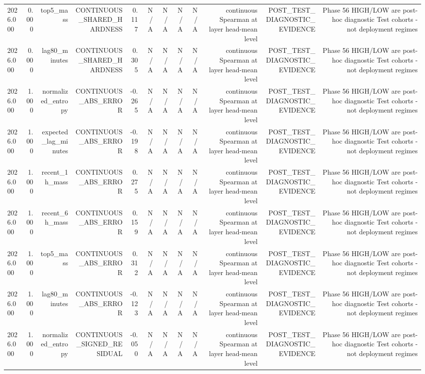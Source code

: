 \begin{table}[h!]
\begin{tabular}{lrrrrrrrrrrr}
2026.000 & 0.000 & top5\_mass & CONTINUOUS\_SHARED\_HARDNESS & 0.117 & N/A & N/A & N/A & N/A & continuous Spearman at layer head-mean level & POST\_TEST\_DIAGNOSTIC\_EVIDENCE & Phase 56 HIGH/LOW are post-hoc diagnostic Test cohorts - not deployment regimes \\
2026.000 & 0.000 & lag80\_minutes & CONTINUOUS\_SHARED\_HARDNESS & 0.305 & N/A & N/A & N/A & N/A & continuous Spearman at layer head-mean level & POST\_TEST\_DIAGNOSTIC\_EVIDENCE & Phase 56 HIGH/LOW are post-hoc diagnostic Test cohorts - not deployment regimes \\
2026.000 & 1.000 & normalized\_entropy & CONTINUOUS\_ABS\_ERROR & -0.265 & N/A & N/A & N/A & N/A & continuous Spearman at layer head-mean level & POST\_TEST\_DIAGNOSTIC\_EVIDENCE & Phase 56 HIGH/LOW are post-hoc diagnostic Test cohorts - not deployment regimes \\
2026.000 & 1.000 & expected\_lag\_minutes & CONTINUOUS\_ABS\_ERROR & -0.198 & N/A & N/A & N/A & N/A & continuous Spearman at layer head-mean level & POST\_TEST\_DIAGNOSTIC\_EVIDENCE & Phase 56 HIGH/LOW are post-hoc diagnostic Test cohorts - not deployment regimes \\
2026.000 & 1.000 & recent\_1h\_mass & CONTINUOUS\_ABS\_ERROR & 0.275 & N/A & N/A & N/A & N/A & continuous Spearman at layer head-mean level & POST\_TEST\_DIAGNOSTIC\_EVIDENCE & Phase 56 HIGH/LOW are post-hoc diagnostic Test cohorts - not deployment regimes \\
2026.000 & 1.000 & recent\_6h\_mass & CONTINUOUS\_ABS\_ERROR & 0.159 & N/A & N/A & N/A & N/A & continuous Spearman at layer head-mean level & POST\_TEST\_DIAGNOSTIC\_EVIDENCE & Phase 56 HIGH/LOW are post-hoc diagnostic Test cohorts - not deployment regimes \\
2026.000 & 1.000 & top5\_mass & CONTINUOUS\_ABS\_ERROR & 0.312 & N/A & N/A & N/A & N/A & continuous Spearman at layer head-mean level & POST\_TEST\_DIAGNOSTIC\_EVIDENCE & Phase 56 HIGH/LOW are post-hoc diagnostic Test cohorts - not deployment regimes \\
2026.000 & 1.000 & lag80\_minutes & CONTINUOUS\_ABS\_ERROR & -0.123 & N/A & N/A & N/A & N/A & continuous Spearman at layer head-mean level & POST\_TEST\_DIAGNOSTIC\_EVIDENCE & Phase 56 HIGH/LOW are post-hoc diagnostic Test cohorts - not deployment regimes \\
2026.000 & 1.000 & normalized\_entropy & CONTINUOUS\_SIGNED\_RESIDUAL & -0.050 & N/A & N/A & N/A & N/A & continuous Spearman at layer head-mean level & POST\_TEST\_DIAGNOSTIC\_EVIDENCE & Phase 56 HIGH/LOW are post-hoc diagnostic Test cohorts - not deployment regimes \\

\end{tabular}
\end{table}
